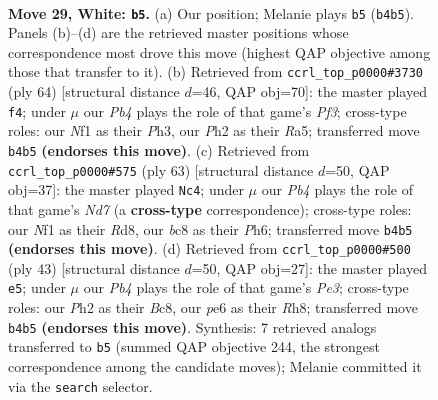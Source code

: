 \documentclass[11pt]{article}
\begin{document}
\clearpage

\begin{figure}[p]\centering
\begin{subfigure}{0.46\textwidth}\centering
\resizebox{\linewidth}{!}{%
\newchessgame
\chessboard[
  setfen={r1b1k3/8/4p3/5pr1/pPn4p/3p4/R5PP/K4NNR w q - 0 29},
  showmover=false,
  pgfstyle=straightmove, color=movearrow, markmove={b4-b5}
]}
\caption{}
\end{subfigure}\hfill
\begin{subfigure}{0.46\textwidth}\centering
\resizebox{\linewidth}{!}{%
\newchessgame
\chessboard[
  setfen={1n1r2k1/p6p/P7/R3Np2/8/2rp1P1P/6P1/3R1K2 w - - 4 33},
  showmover=false,
  pgfstyle=straightmove, color=movearrow, markmove={f3-f4}
]}
\caption{}
\end{subfigure}
\\[4pt]
\begin{subfigure}{0.46\textwidth}\centering
\resizebox{\linewidth}{!}{%
\newchessgame
\chessboard[
  setfen={3r3k/1R4p1/6rp/5p2/P7/2N1P1P1/1B1n1P1P/6K1 b - - 2 32},
  showmover=false,
  pgfstyle=straightmove, color=movearrow, markmove={d2-c4}
]}
\caption{}
\end{subfigure}\hfill
\begin{subfigure}{0.46\textwidth}\centering
\resizebox{\linewidth}{!}{%
\newchessgame
\chessboard[
  setfen={r1b1k2r/5p2/1p2p3/6Pp/3nP3/7P/PP6/R1BBK2R b KQkq - 1 22},
  showmover=false,
  pgfstyle=straightmove, color=movearrow, markmove={e6-e5}
]}
\caption{}
\end{subfigure}
\caption{\textbf{Move 29, White: \texttt{b5}.} (a) Our position; Melanie plays \texttt{b5} (\texttt{b4b5}). Panels (b)--(d) are the retrieved master positions whose correspondence most drove this move (highest QAP objective among those that transfer to it). (b) Retrieved from \texttt{ccrl\_top\_p0000\#3730} (ply 64) [structural distance $d$=46, QAP obj=70]: the master played \texttt{f4}; under $\mu$ our \emph{Pb4} plays the role of that game's \emph{Pf3}; cross-type roles: our \emph{N}f1 as their \emph{P}h3, our \emph{P}h2 as their \emph{R}a5; transferred move \texttt{b4b5} \textbf{(endorses this move)}. (c) Retrieved from \texttt{ccrl\_top\_p0000\#575} (ply 63) [structural distance $d$=50, QAP obj=37]: the master played \texttt{Nc4}; under $\mu$ our \emph{Pb4} plays the role of that game's \emph{Nd7} (a \textbf{cross-type} correspondence); cross-type roles: our \emph{N}f1 as their \emph{R}d8, our \emph{b}c8 as their \emph{P}h6; transferred move \texttt{b4b5} \textbf{(endorses this move)}. (d) Retrieved from \texttt{ccrl\_top\_p0000\#500} (ply 43) [structural distance $d$=50, QAP obj=27]: the master played \texttt{e5}; under $\mu$ our \emph{Pb4} plays the role of that game's \emph{Pe3}; cross-type roles: our \emph{P}h2 as their \emph{B}c8, our \emph{p}e6 as their \emph{R}h8; transferred move \texttt{b4b5} \textbf{(endorses this move)}. Synthesis: 7 retrieved analogs transferred to \texttt{b5} (summed QAP objective 244, the strongest correspondence among the candidate moves); Melanie committed it via the \texttt{search} selector.}
\label{fig:thought-m56}
\end{figure}
\end{document}

